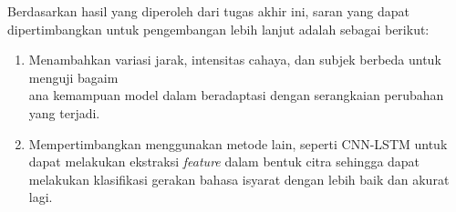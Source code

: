 Berdasarkan hasil yang diperoleh dari tugas akhir ini, saran yang dapat dipertimbangkan untuk pengembangan lebih lanjut adalah sebagai berikut:

\begin{enumerate}[nolistsep]

  \item Menambahkan variasi jarak, intensitas cahaya, dan subjek berbeda untuk menguji bagaim\\ana kemampuan model dalam beradaptasi dengan serangkaian perubahan yang terjadi.
  \item Mempertimbangkan menggunakan metode lain, seperti CNN-LSTM untuk dapat melakukan ekstraksi \emph{feature} dalam bentuk citra sehingga dapat melakukan klasifikasi gerakan bahasa isyarat dengan lebih baik dan akurat lagi.

\end{enumerate}
